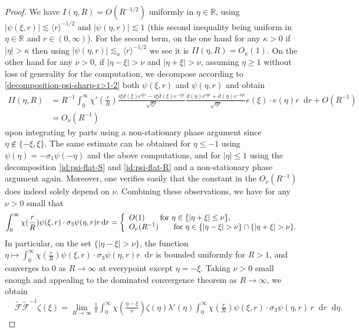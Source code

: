 \documentclass[11 pt]{amsart}
\theoremstyle{definition}
\theoremstyle{remark}
\numberwithin{equation}{section}
\newcommand{\dd}{\mathop{}\!\mathrm{d}}
\begin{document}
\begin{proof}
We have $I(\eta,R)=O(R^{-1/2})$ uniformly in $\eta \in \mathbb R$, using $|\psi(\xi,r)|\lesssim \langle r \rangle^{-1/2}$ and $|\psi(\eta,r)|\lesssim 1$ (this second inequality being uniform in $\eta\in \mathbb R$ and $r\in (0,\infty)$). For the second term, on the one hand for any $\kappa>0$ if $|\eta|>\kappa $ then using $|\psi(\eta,r)|\lesssim_\kappa \langle r \rangle^{-1/2}$ we see it is $II(\eta,R)=O_\kappa(1)$. On the other hand for any $\nu>0$, if $|\eta-\xi|>\nu$ and $|\eta+\xi|>\nu$, assuming $\eta\geq 1$ without loss of generality for the computation, we decompose according to \eqref{decomposition-psi-sharp-r>1-2} both $ \psi(\xi,r)$ and $\psi(\eta,r)$ and obtain
\begin{align*}
II(\eta,R) & =R^{-1} \int_0^\infty \chi'(\frac{r}{R})  \frac{i\xi d(\xi)e^{i\xi r}-i\xi \bar d(\xi)e^{-i\xi r}}{\sqrt{\xi r}}  \frac{d(\eta)e^{i\eta r}+\bar d(\eta)e^{-i\eta r}}{\sqrt{\eta r}} e(\xi) \cdot e(\eta) r\dd r  +O(R^{-1})\\
& = O_\nu(R^{-1})
\end{align*}
upon integrating by parts using a non-stationary phase argument since $\eta \notin \{-\xi,\xi\}$. The same estimate can be obtained for $\eta\leq -1$ using $\psi(\eta)=-\sigma_1\psi(-\eta)$ and the above computations, and for $|\eta|\leq 1$ using the decomposition \eqref{id:psi-flat-S} and \eqref{id:psi-flat-R} and a non-stationary phase argument again. Moreover, one verifies easily that the constant in the $O_\nu(R^{-1})$ does indeed solely depend on $\nu$. Combining these observations, we have for any $\nu>0$ small that
\begin{equation} \label{inversion-tildeF-tildeF-1-inter2}
\int_0^\infty \chi(\frac{r}{R})\psi(\xi,r)\cdot \sigma_3 \psi(\eta,r)r\dd r = \left\{ \begin{array}{l l} O(1) \qquad \mbox{for }\eta\in \{|\eta+\xi|\leq \nu\}, \\
O_\nu (R^{-1}) \qquad \mbox{for }\eta\in \{|\eta-\xi|>\nu\}\cap \{|\eta+\xi|>\nu\}.
\end{array} \right.
\end{equation}
In particular, on the set $\{|\eta-\xi|>\nu\}$, the function $\eta\mapsto \int_0^\infty \chi(\frac{r}{R})\psi(\xi,r)\cdot \sigma_3 \psi(\eta,r)r\dd r$ is bounded  uniformly for $R>1$, and converges to $0$ as $R\to \infty$ at everypoint except $\eta=-\xi$. Taking $\nu>0$ small enough and appealing to the dominated convergence theorem as $R\to \infty$, we obtain
\begin{align*}
& \widetilde{\mathcal F} \widetilde{\mathcal F}^{-1} \zeta (\xi)  = \lim_{R \to \infty} \frac{1}{\pi} \int_0^\infty \chi (\frac{\eta-\xi}{\nu}) \zeta(\eta)  \lambda'(\eta)  \int_0^\infty \chi \left( \frac{r}{R} \right) \psi(\xi,r) \cdot \sigma_3  \psi(\eta ,r)  \,r \dd r   \dd \eta   .

\end{align*}
\end{proof}
\end{document}
